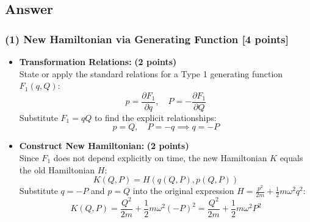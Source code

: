 \documentclass[11pt, a4paper]{article} %
\begin{document}
\subsection*{Answer}

\subsubsection*{(1) New Hamiltonian via Generating Function [4 points]}
\begin{itemize}
    \item \textbf{Transformation Relations:} \hfill \textbf{(2 points)} \\
    State or apply the standard relations for a Type 1 generating function $F_1(q, Q)$:
    \[ p = \frac{\partial F_1}{\partial q}, \quad P = - \frac{\partial F_1}{\partial Q} \]
    Substitute $F_1 = qQ$ to find the explicit relationships:
    \[ p = Q, \quad P = -q \implies q = -P \]

    \item \textbf{Construct New Hamiltonian:} \hfill \textbf{(2 points)} \\
    Since $F_1$ does not depend explicitly on time, the new Hamiltonian $K$ equals the old Hamiltonian $H$:
    \[ K(Q, P) = H(q(Q, P), p(Q, P)) \]
    Substitute $q = -P$ and $p = Q$ into the original expression $H = \frac{p^2}{2m} + \frac{1}{2}m\omega^2 q^2$:
    \[ K(Q, P) = \frac{Q^2}{2m} + \frac{1}{2}m\omega^2 (-P)^2 = \frac{Q^2}{2m} + \frac{1}{2}m\omega^2 P^2 \]
\end{itemize}
\end{document}
